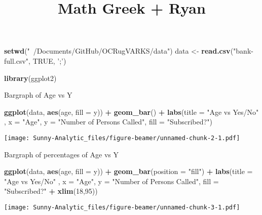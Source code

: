 \documentclass[ignorenonframetext,]{beamer}
\title{Math Greek + Ryan}
\date{}
\newenvironment{Shaded}{\begin{snugshade}}{\end{snugshade}}
\newcommand{\DataTypeTok}[1]{\textcolor[rgb]{0.13,0.29,0.53}{#1}}
\newcommand{\DecValTok}[1]{\textcolor[rgb]{0.00,0.00,0.81}{#1}}
\newcommand{\KeywordTok}[1]{\textcolor[rgb]{0.13,0.29,0.53}{\textbf{#1}}}
\newcommand{\NormalTok}[1]{#1}
\newcommand{\OperatorTok}[1]{\textcolor[rgb]{0.81,0.36,0.00}{\textbf{#1}}}
\newcommand{\OtherTok}[1]{\textcolor[rgb]{0.56,0.35,0.01}{#1}}
\newcommand{\StringTok}[1]{\textcolor[rgb]{0.31,0.60,0.02}{#1}}
\begin{document}
\frame{\titlepage}

\begin{frame}[fragile]

\begin{Shaded}
\begin{Highlighting}[]
\KeywordTok{setwd}\NormalTok{(}\StringTok{"~/Documents/GitHub/OCRugVARKS/data"}\NormalTok{)}
\NormalTok{data <-}\StringTok{ }\KeywordTok{read.csv}\NormalTok{(}\StringTok{"bank-full.csv"}\NormalTok{, }\OtherTok{TRUE}\NormalTok{, }\StringTok{';'}\NormalTok{)}

\KeywordTok{library}\NormalTok{(ggplot2)}
\end{Highlighting}
\end{Shaded}

\end{frame}

\begin{frame}[fragile]{Bargraph of Age vs Y}
\protect\hypertarget{bargraph-of-age-vs-y}{}

\begin{Shaded}
\begin{Highlighting}[]
\KeywordTok{ggplot}\NormalTok{(data, }\KeywordTok{aes}\NormalTok{(age, }\DataTypeTok{fill =}\NormalTok{ y)) }\OperatorTok{+}\StringTok{ }\KeywordTok{geom_bar}\NormalTok{() }\OperatorTok{+}
\StringTok{  }\KeywordTok{labs}\NormalTok{(}\DataTypeTok{title =} \StringTok{"Age vs Yes/No"}\NormalTok{ , }
  \DataTypeTok{x =} \StringTok{"Age"}\NormalTok{,}
  \DataTypeTok{y =} \StringTok{"Number of Persons Called"}\NormalTok{,}
  \DataTypeTok{fill =} \StringTok{"Subscribed?"}\NormalTok{) }
\end{Highlighting}
\end{Shaded}

\texttt{[image: Sunny-Analytic\_files/figure-beamer/unnamed-chunk-2-1.pdf]}

\end{frame}

\begin{frame}[fragile]{Bargraph of percentages of Age vs Y}
\protect\hypertarget{bargraph-of-percentages-of-age-vs-y}{}

\begin{Shaded}
\begin{Highlighting}[]
\KeywordTok{ggplot}\NormalTok{(data, }\KeywordTok{aes}\NormalTok{(age, }\DataTypeTok{fill =}\NormalTok{ y)) }\OperatorTok{+}\StringTok{ }\KeywordTok{geom_bar}\NormalTok{(}\DataTypeTok{position =} \StringTok{"fill"}\NormalTok{) }\OperatorTok{+}
\StringTok{  }\KeywordTok{labs}\NormalTok{(}\DataTypeTok{title =} \StringTok{"Age vs Yes/No"}\NormalTok{ , }
       \DataTypeTok{x =} \StringTok{"Age"}\NormalTok{,}
       \DataTypeTok{y =} \StringTok{"Number of Persons Called"}\NormalTok{,}
       \DataTypeTok{fill =} \StringTok{"Subscribed?"} \OperatorTok{+}\StringTok{  }
\StringTok{  }\KeywordTok{xlim}\NormalTok{(}\DecValTok{18}\NormalTok{,}\DecValTok{95}\NormalTok{))}
\end{Highlighting}
\end{Shaded}

\texttt{[image: Sunny-Analytic\_files/figure-beamer/unnamed-chunk-3-1.pdf]}

\end{frame}
\end{document}
